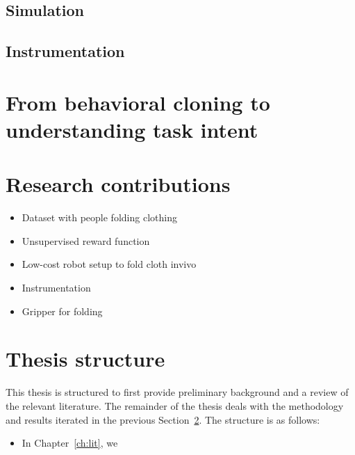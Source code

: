 \documentclass[\home/main.tex]{subfiles}
\begin{document}
\subsection{Simulation}
\subsection{Instrumentation}
\section{From behavioral cloning to understanding task intent}
\section{Research contributions} \label{sec:intro_contributions}
\begin{itemize}
    \item Dataset with people folding clothing
    \item Unsupervised reward function
    \item Low-cost robot setup to fold cloth invivo
    \item Instrumentation
    \item Gripper for folding
\end{itemize}

\section{Thesis structure}
This thesis is structured to first provide preliminary background and a review of the relevant literature. The remainder of the thesis deals with the methodology and results iterated in the previous Section~\ref{sec:intro_contributions}. The structure is as follows:
\begin{itemize}
    \item In Chapter~\ref{ch:lit}, we
\end{itemize}
\end{document}
